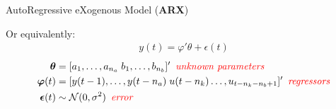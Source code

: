 \documentclass[aspectratio=169,hyperref={pdfpagelabels=false}]{beamer}
\begin{document}
  \begin{frame}{AutoRegressive eXogenous Model (\textbf{ARX})}
    \begin{block}{}
      Or equivalently:
      \vspace{0.1em}
      \begin{align*}
        \boxed{y(t) = \varphi'\theta + \epsilon(t)}
      \end{align*}
    \begin{align*}
      \bm{\theta} &= [a_1, \dots, a_{n_a} \; b_1, \dots, b_{n_b}]' \hspace{0.5em }\textit{\textcolor{red}{unknown parameters}} \\
      \bm{\varphi}(t) &= [y(t-1), \dots, y(t-n_a) \; u(t-n_k) \dots, u_{t-n_k-n_b+1}]' \hspace{0.5em }\textit{\textcolor{red}{regressors}}\\
      \bm{\epsilon}(t) &\sim \mathcal{N}(0,\sigma^2) \hspace{0.5em }\textit{\textcolor{red}{error}}
    \end{align*} \pause  
    \end{block}
    \end{frame}
\end{document}
